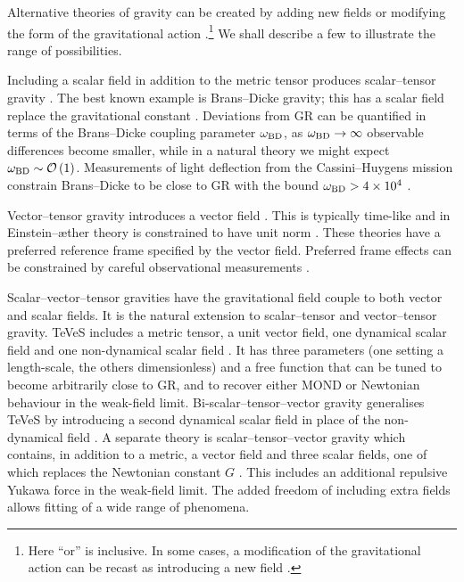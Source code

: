 Alternative theories of gravity can be created by adding new fields or modifying the form of the gravitational action \citep{Gair2012a}.\footnote{Here ``or'' is inclusive. In some cases, a modification of the gravitational action can be recast as introducing a new field \citep[e.g.,][]{Wands1994,Jacobson2010}.} We shall describe a few to illustrate the range of possibilities.

Including a scalar field in addition to the metric tensor produces scalar--tensor gravity \citep{Wagoner1970,Nordtvedt1970Jr,Fujii2003}. The best known example is Brans--Dicke gravity; this has a scalar field replace the gravitational constant \citep{Brans1961,Dicke1962}. Deviations from GR can be quantified in terms of the Brans--Dicke coupling parameter $\omega_\mathrm{BD}$, as $\omega_\mathrm{BD} \rightarrow \infty$ observable differences become smaller, while in a natural theory we might expect $\omega_\mathrm{BD} \sim \mathcal{O}\left({1}\right)$. Measurements of light deflection from the Cassini--Huygens mission \citep{Bertotti2003} constrain Brans--Dicke to be close to GR with the bound $\omega_\mathrm{BD} > 4 \times 10^4$ \citep{Will2006}.

Vector--tensor gravity introduces a vector field \citep{Will1972Jr,Nordtvedt1972Jr}. This is typically time-like and in Einstein--\ae{}ther theory is constrained to have unit norm \citep{Jacobson2001,Jacobson2008}. These theories have a preferred reference frame specified by the vector field. Preferred frame effects can be constrained by careful observational measurements \citep[chapter 8]{Will1993}.


Scalar--vector--tensor gravities have the gravitational field couple to both vector and scalar fields. It is the natural extension to scalar--tensor and vector--tensor gravity. TeVeS includes a metric tensor, a unit vector field, one dynamical scalar field and one non-dynamical scalar field \citep{Bekenstein2004,Skordis2009}. It has three parameters (one setting a length-scale, the others dimensionless) and a free function that can be tuned to become arbitrarily close to GR, and to recover either MOND or Newtonian behaviour in the weak-field limit. Bi-scalar--tensor--vector gravity generalises TeVeS by introducing a second dynamical scalar field in place of the non-dynamical field \citep{Sanders2005}. A separate theory is scalar--tensor--vector gravity which contains, in addition to a metric, a vector field and three scalar fields, one of which replaces the Newtonian constant $G$ \citep{Moffat2006}. This includes an additional repulsive Yukawa force in the weak-field limit. The added freedom of including extra fields allows fitting of a wide range of phenomena.

